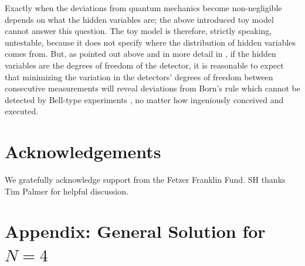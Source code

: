 \documentclass[12pt]{article}
\begin{document}
Exactly when the deviations from quantum mechanics become non-negligible depends on what the hidden variables are; the above introduced toy model cannot answer this question. The toy model is therefore, strictly speaking, untestable, because it does not specify where the distribution of hidden variables comes from. But, as pointed out above and in more detail in \cite{Hossenfelder:2011ct,Hossenfelder:2019shy}, if the hidden variables are the degrees of freedom of the detector, it is reasonable to expect that
minimizing the variation in the detectors' degrees of freedom between consecutive measurements will reveal deviations from Born's rule which cannot be detected by Bell-type experiments \cite{Leung:2017ndn,bigbell,Friedman:2018byq}, no matter how ingeniously conceived and executed. 

 

\section*{Acknowledgements}

We gratefully acknowledge support from the Fetzer Franklin Fund. SH thanks Tim Palmer for helpful discussion.

\clearpage

\section*{Appendix: General Solution for $N=4$}
%
\end{document}
